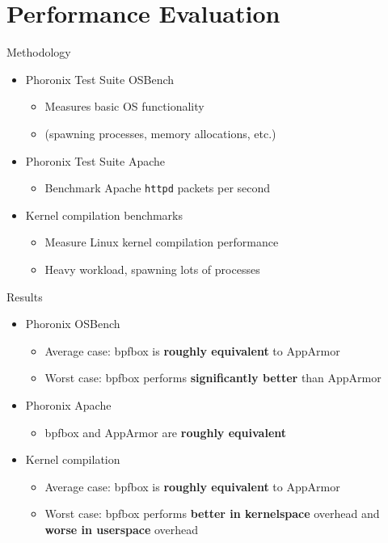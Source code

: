\documentclass[12pt, dvipsnames]{beamer}
\begin{document}
\section{Performance Evaluation}

\begin{frame}[c]{Methodology}
\begin{itemize}
    \item Phoronix Test Suite OSBench
    \begin{itemize}
        \item Measures basic OS functionality
        \item (spawning processes, memory allocations, etc.)
    \end{itemize}

    \vfill
    \item Phoronix Test Suite Apache
    \begin{itemize}
        \item Benchmark Apache \texttt{httpd} packets per second
    \end{itemize}

    \vfill
    \item Kernel compilation benchmarks
    \begin{itemize}
        \item Measure Linux kernel compilation performance
        \item Heavy workload, spawning lots of processes
    \end{itemize}
\end{itemize}
\end{frame}

\begin{frame}[c]{Results}
\begin{itemize}
    \item Phoronix OSBench
    \begin{itemize}
        \item Average case: bpfbox is \textbf{roughly equivalent} to AppArmor
        \item Worst case: bpfbox performs \textbf{significantly better} than AppArmor
    \end{itemize}

    \vfill
    \item Phoronix Apache
    \begin{itemize}
        \item bpfbox and AppArmor are \textbf{roughly equivalent}
    \end{itemize}

    \vfill
    \item Kernel compilation
    \begin{itemize}
        \item Average case: bpfbox is \textbf{roughly equivalent} to AppArmor
        \item Worst case: bpfbox performs \textbf{better in kernelspace} overhead and \textbf{worse in userspace} overhead
    \end{itemize}
\end{itemize}
\end{frame}
\end{document}
